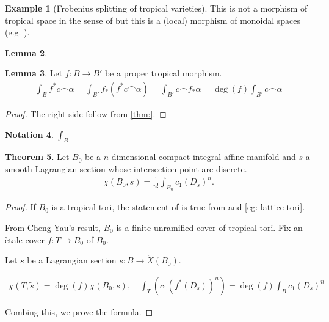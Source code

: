 \documentclass[a4paper,dvipdfmx,reqno,12pt]{amsart}
\theoremstyle{definition}
\newtheorem{Thm}{Theorem}[section]
\newtheorem{Eg}[Thm]{Example}
\newtheorem{Lem}[Thm]{Lemma}
\newtheorem{Not}[Thm]{Notation}
\newcommand{\opn}[1]{\operatorname{#1}}
\numberwithin{equation}{section}
\begin{document}
\begin{Eg}[Frobenius splitting of tropical varieties]

  This is not a morphism of tropical space in the sense of
  \cite{gross2019sheaftheoretic} but this is a (local) morphism
  of monoidal spaces (e.g. \cite[II Definition 1.1.1]{MR3838359}).

\end{Eg}

\begin{Lem}

\end{Lem}

\begin{Lem}
  Let $f:B\to B'$ be a proper tropical morphism.
  \begin{align}
    \int_{B} f^{*}c\frown \alpha=\int_{B'} f_*(f^{*}c\frown \alpha)
    =\int_{B'}c \frown f_*\alpha=\opn{deg}(f)\int_{B'} c\frown \alpha
  \end{align}
\end{Lem}

\begin{proof}
  The right side follow from \cref{thm:}.
\end{proof}

\begin{Not}
  $\int_B$
\end{Not}

\begin{Thm}
  Let $B_0$ be a $n$-dimensional compact integral affine manifold and
  $s$ a smooth Lagrangian section
  whose intersection point are discrete.
  \begin{align}
    \chi(B_0,s)=\frac{1}{n!}\int_{B_0}c_1(D_s)^{n}.
  \end{align}

\end{Thm}
\begin{proof}

  If $B_0$ is a tropical tori, the statement of is true from \cite[]{} and \cref{eg: lattice tori}.

  From Cheng-Yau's result, $B_0$ is a finite unramified cover of tropical tori.
  Fix an \`etale cover $f:T \to B_0$ of $B_0$.

  Let $s$ be a Lagrangian section $s:B\to \check{X}(B_0)$.

  \begin{align}
    \chi(T,\tilde{s})=\opn{deg}(f)\chi(B_0,s),\quad \int_{T}(c_1(f^{*}(D_s))^{n})=\opn{deg}(f)\int_{B}c_1(D_s)^{n}
  \end{align}

  Combing this, we prove the formula.

\end{proof}
\end{document}
